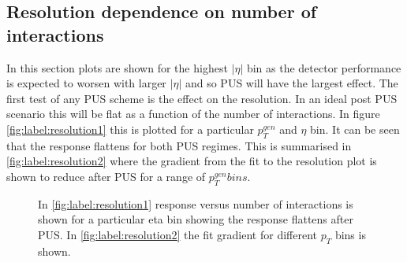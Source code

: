 \subsection{Resolution dependence on number of interactions}

In this section plots are shown for the highest $|\eta|$ bin as the detector performance is expected to worsen with larger $|\eta|$ and so PUS will have the largest effect. The first test of any PUS scheme is the effect on the resolution. In an ideal post PUS scenario this will be flat as a function of the number of interactions. In figure \ref{fig:label:resolution1} this is plotted for a particular $p^{gen}_T$ and $\eta$ bin. It can be seen that the response flattens for both PUS regimes. This is summarised in \ref{fig:label:resolution2} where the gradient from the fit to the resolution plot is shown to reduce after PUS for a range of $p^{gen}_T bins$.  
\begin{figure}
\hfill
{}
\hfill
{}
\caption{In \ref{fig:label:resolution1} response versus number of interactions is shown for a particular eta bin showing the response flattens after PUS. In \ref{fig:label:resolution2} the fit gradient for different $p_{T}$ bins is shown.}
\label{fig:label:resolution}
\end{figure}
